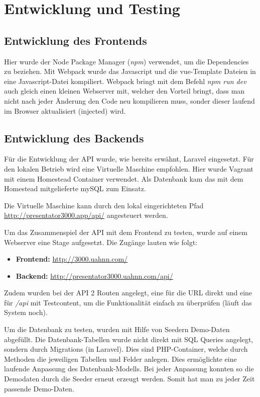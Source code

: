 \chapter{Entwicklung und Testing}
\label{chap:testing}

\section{Entwicklung des Frontends}
Hier wurde der Node Package Manager (\emph{npm}) verwendet, um die Dependencies zu beziehen. Mit Webpack wurde das Javascript und die vue-Template Dateien in eine Javascript-Datei kompiliert. Webpack bringt mit dem Befehl \emph{npm run dev} auch gleich einen kleinen Webserver mit, welcher den Vorteil bringt, dass man nicht nach jeder Änderung den Code neu kompilieren muss, sonder dieser laufend im Browser aktualisiert (injected) wird.

\section{Entwicklung des Backends}
Für die Entwicklung der API wurde, wie bereits erwähnt, Laravel eingesetzt. Für den lokalen Betrieb wird eine Virtuelle Maschine empfohlen. Hier wurde Vagrant mit einem Homestead Container verwendet. Als Datenbank kam das mit dem Homestead mitgelieferte mySQL zum Einsatz.

Die Virtuelle Maschine kann durch den lokal eingerichteten Pfad \url{http://presentator3000.app/api/} angesteuert werden.

Um das Zusammenspiel der API mit dem Frontend zu testen, wurde auf einem Webserver eine Stage aufgesetzt. Die Zugänge lauten wie folgt:

\begin{itemize}
	\item \textbf{Frontend:} \url{http://3000.uahnn.com/}
	\item \textbf{Backend:} \url{http://presentator3000.uahnn.com/api/}
\end{itemize}

Zudem wurden bei der API 2 Routen angelegt, eine für die URL direkt und eine für \emph{/api} mit Testcontent, um die Funktionalität einfach zu überprüfen (läuft das System noch).

Um die Datenbank zu testen, wurden mit Hilfe von Seedern Demo-Daten abgefüllt. Die Datenbank-Tabellen wurde nicht direkt mit SQL Queries angelegt, sondern durch Migrations (in Laravel). Dies sind PHP-Container, welche durch Methoden die jeweiligen Tabellen und Felder anlegen. Dies ermöglichte eine laufende Anpassung des Datenbank-Modells. Bei jeder Anpassung konnten so die Demodaten durch die Seeder erneut erzeugt werden. Somit hat man zu jeder Zeit passende Demo-Daten. 


